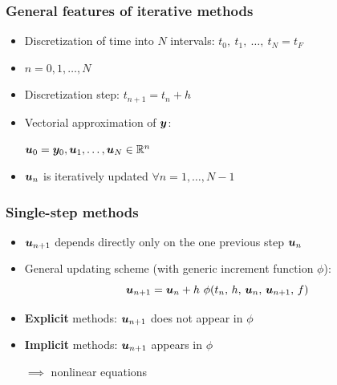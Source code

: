 \documentclass{beamer}
\begin{document}
\begin{frame} %
	\frametitle{General features of iterative methods}
	\begin{itemize}
		\item Discretization of time into $N$ intervals: $t_0, \ t_1, \ \dots, \ t_{N} = t_F$
		\item $n = 0, 1, \dots, N$
		\item Discretization step: $t_{n+1} = t_n + h$
		\pause
		\item Vectorial approximation of $\boldsymbol y$:
		\begin{center}
			$\boldsymbol u_0 = \boldsymbol y_0, \boldsymbol u_1, \dots, \boldsymbol u_{N} \in \mathbb R^n$
		\end{center}
		\item $\boldsymbol u_n$ is iteratively updated $\forall n = 1, \dots, N-1$
	\end{itemize}
\end{frame}


\begin{frame}
	\frametitle{Single-step methods} %
	\begin{itemize}
		\item $\boldsymbol u_{n+1}$ depends directly only on the one previous step $\boldsymbol u_{n}$
		\item General updating scheme (with generic increment function $\phi$):
		$$ \boldsymbol u_{n+1} = \boldsymbol u_{n} + h \ \phi(t_n, \, h, \, \boldsymbol u_n, \, \boldsymbol u_{n+1}, \, f) $$
		\pause
		\item \textbf{Explicit} methods: $\boldsymbol u_{n+1}$ does not appear in $\phi$
		\item \textbf{Implicit} methods: $\boldsymbol u_{n+1}$ appears in $\phi$
		\begin{center}
			\vspace{-5pt}
			$\implies$ nonlinear equations
		\end{center}
	\end{itemize}
\end{frame}
\end{document}
